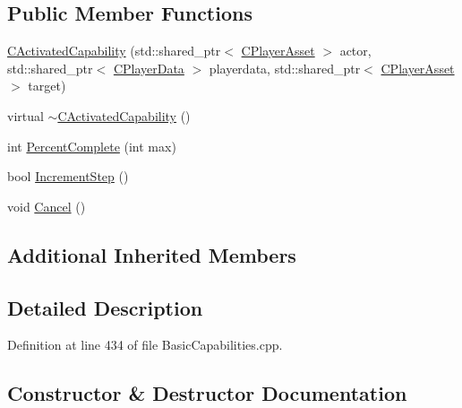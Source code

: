 \subsection*{Public Member Functions}
\begin{DoxyCompactItemize}
\item 
\hyperlink{classCPlayerCapabilityConvey_1_1CActivatedCapability_a2968542706742c59821f3e512c693cf9}{C\+Activated\+Capability} (std\+::shared\+\_\+ptr$<$ \hyperlink{classCPlayerAsset}{C\+Player\+Asset} $>$ actor, std\+::shared\+\_\+ptr$<$ \hyperlink{classCPlayerData}{C\+Player\+Data} $>$ playerdata, std\+::shared\+\_\+ptr$<$ \hyperlink{classCPlayerAsset}{C\+Player\+Asset} $>$ target)
\item 
virtual \hyperlink{classCPlayerCapabilityConvey_1_1CActivatedCapability_a10c78ea328de946070399c5596915641}{$\sim$\+C\+Activated\+Capability} ()
\item 
int \hyperlink{classCPlayerCapabilityConvey_1_1CActivatedCapability_aec6b75fc004f4ac18755d8f601c8ffca}{Percent\+Complete} (int max)
\item 
bool \hyperlink{classCPlayerCapabilityConvey_1_1CActivatedCapability_ac1bf251eca552885041b1bcefa594591}{Increment\+Step} ()
\item 
void \hyperlink{classCPlayerCapabilityConvey_1_1CActivatedCapability_ad84a94a1ae3647ea160e262a0154e229}{Cancel} ()
\end{DoxyCompactItemize}
\subsection*{Additional Inherited Members}


\subsection{Detailed Description}


Definition at line 434 of file Basic\+Capabilities.\+cpp.



\subsection{Constructor \& Destructor Documentation}
\hypertarget{classCPlayerCapabilityConvey_1_1CActivatedCapability_a2968542706742c59821f3e512c693cf9}{}\label{classCPlayerCapabilityConvey_1_1CActivatedCapability_a2968542706742c59821f3e512c693cf9} 
